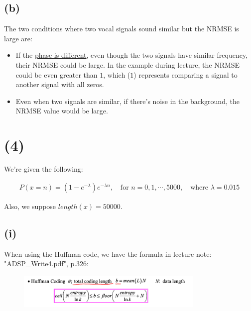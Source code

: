 \documentclass{article}
\begin{document}
\subsection*{(b)}

The two conditions where two vocal signals sound similar but the NRMSE is large are:

\begin{itemize}
    \item If the \underline{phase is different}, even though the two signals have similar frequency, 
    their NRMSE could be large. In the example during lecture, the NRMSE could be even greater than $1$, 
    which ($1$) represents comparing a signal to another signal with all zeros.
    \item Even when two signals are similar, if there's noise in the background, the NRMSE value would be large.
\end{itemize}

\section*{(4)}

We're given the following:

\begin{align*}
    P(x = n) = (1 - e^{-\lambda}) e^{-\lambda n}, \quad \text{for } n = 0, 1, \cdots, 5000, \quad \text{where } \lambda = 0.015
\end{align*}

Also, we suppose $length(x) = 50000$.

\subsection*{(i)}

When using the Huffman code, 
we have the formula in lecture note: "ADSP\_Write4.pdf", p.326:

\begin{figure}[H]
    \centering
    \includegraphics[width=0.8\textwidth]{HW4_img/4_huffman_total_coding_length}
\end{figure}

\end{document}
